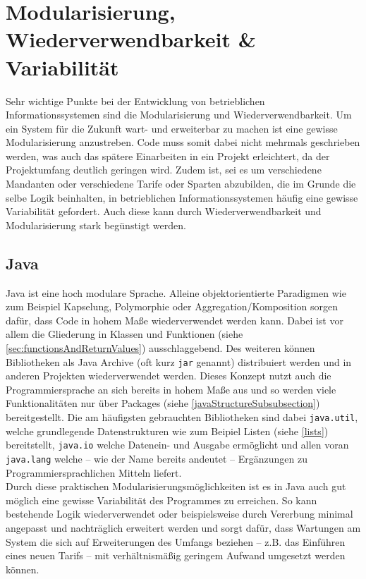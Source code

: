 \section{Modularisierung, Wiederverwendbarkeit \& Variabilität}

Sehr wichtige Punkte bei der Entwicklung von betrieblichen Informationssystemen sind die Modularisierung und Wiederverwendbarkeit. Um ein System für die Zukunft wart- und erweiterbar zu machen ist eine gewisse Modularisierung anzustreben. Code muss somit dabei nicht mehrmals geschrieben werden, was auch das spätere Einarbeiten in ein Projekt erleichtert, da der Projektumfang deutlich geringen wird. Zudem ist, sei es um verschiedene Mandanten oder verschiedene Tarife oder Sparten abzubilden, die im Grunde die selbe Logik beinhalten, in betrieblichen Informationssystemen häufig eine gewisse Variabilität gefordert. Auch diese kann durch Wiederverwendbarkeit und Modularisierung stark begünstigt werden.\\

\subsection*{Java}
Java ist eine hoch modulare Sprache. Alleine objektorientierte Paradigmen wie zum Beispiel Kapselung, Polymorphie oder Aggregation/Komposition sorgen dafür, dass Code in hohem Maße wiederverwendet werden kann. Dabei ist vor allem die Gliederung in Klassen und Funktionen (siehe \autoref{sec:functionsAndReturnValues}) ausschlaggebend. Des weiteren können Bibliotheken als Java Archive (oft kurz \texttt{jar} genannt) dis­tri­bu­ie­rt werden und in anderen Projekten wiederverwendet werden. Dieses Konzept nutzt auch die Programmiersprache an sich bereits in hohem Maße aus und so werden viele Funktionalitäten nur über Packages (siehe \autoref{javaStructureSubsubsection}) bereitgestellt. Die am häufigsten gebrauchten Bibliotheken sind dabei \texttt{java.util}, welche grundlegende Datenstrukturen wie zum Beipiel Listen (siehe \autoref{lists}) bereitstellt, \texttt{java.io} welche Datenein- und Ausgabe ermöglicht und allen voran \texttt{java.lang} welche -- wie der Name bereits andeutet -- Ergänzungen zu Programmiersprachlichen Mitteln liefert. \\

Durch diese praktischen Modularisierungsmöglichkeiten ist es in Java auch gut möglich eine gewisse Variabilität des Programmes zu erreichen. So kann bestehende Logik wiederverwendet oder beispielsweise durch Vererbung minimal angepasst und nachträglich erweitert werden und sorgt dafür, dass Wartungen am System die sich auf Erweiterungen des Umfangs beziehen -- z.B. das Einführen eines neuen Tarifs -- mit verhältnismäßig geringem Aufwand umgesetzt werden können.\\

